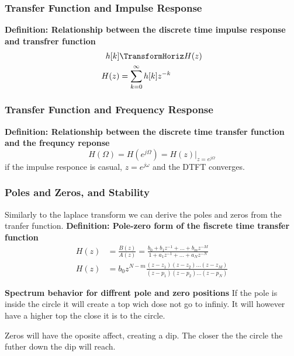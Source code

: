 \documentclass{article}
\begin{document}
\subsubsection{Transfer Function and Impulse Response}
\textbf{Definition: Relationship between the discrete time impulse response and transfrer function}
\begin{align*}
    h[k] &\TransformHoriz H(z) \\
    H(z) &= \sum_{k=0}^{\infty} h[k]z^{-k} \\
\end{align*}

\subsubsection{Transfer Function and Frequency Response}
\textbf{Definition: Relationship between the discrete time transfer function and the frequncy reponse}
\begin{equation*}
    H(\Omega)=H(e^{j\Omega}) = H(z)|_{z=e^{j\Omega}}
\end{equation*}
if the impulse responce is casual, $z=e^{j\omega}$ and the DTFT converges.

\subsubsection{Poles and Zeros, and Stability}
Similarly to the laplace transform we can derive the poles and zeros from the tranfer function.
\textbf{Definition: Pole-zero form of the fiscrete time transfer function}
\begin{align*}
    H(z) &= \frac{B(z)}{A(z)} = \frac{b_0+b_1z^{-1}+\ldots+b_mz^{-M}}{1+a_1z^{-1}+\ldots+a_Nz^{-N}} \\
    H(z) &= b_0z^{N-m}\frac{(z-z_1)(z-z_2)\ldots(z-z_M)}{(z-p_1)(z-p_2)\ldots(z-p_N)}
\end{align*}

\textbf{Spectrum behavior for diffrent pole and zero positions}
If the pole is inside the circle it will create a top wich dose not go to 
infiniy. It will however have a higher top the close it is to the circle.

Zeros will have the oposite affect, creating a dip. The closer the the
circle the futher down the dip will reach.
\end{document}
